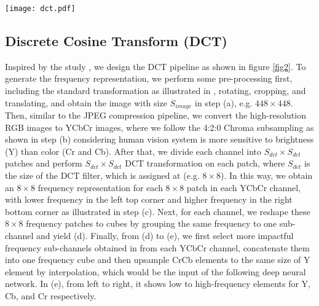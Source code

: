 \documentclass[10pt, conference, compsocconf]{IEEEtran}
\begin{document}
\begin{figure*}[tp]
\centering
\texttt{[image: dct.pdf]}\caption{{}{(a) images after preprocessing, e.g. $448\times448\times3$. (b) transform RGB to YCbCr images, Y: $448\times448$, Cr and Cb: $224\times224$. (c) frequency representation after DCT transformation with a filter, e.g. 8x8, (d) reorganize frequency representations by frequency channels, Y: $56\times56\times64$, Cb and Cr: $28\times28\times64$. (e) upsample all $Cr_{dct}$ and $Cb_{dct}$ frequency channels to the same size with $Y_{dct}$ channels and keep those frequency selected channels. Y: $56\times56\times16$, Cb and Cr: $28\times28\times4$.}}
\label{fig2}
\end{figure*}
\subsection{Discrete Cosine Transform (DCT)}

Inspired by the study \cite{XuKai2020}, we design the DCT pipeline as shown in figure \ref{fig2}. To generate the frequency representation, we perform some pre-processing first, including the standard transformation as illustrated in \cite{krizhevsky2017imagenet}, rotating, cropping, and translating, and obtain the image with size $S_{image}$ in step (a), e.g. $448\times 448$. Then, similar to the JPEG compression pipeline, we convert the high-resolution RGB images to YCbCr images, where we follow the 4:2:0 Chroma subsampling as shown in step (b) considering human vision system is more sensitive to brightness (Y) than color (Cr and Cb). After that, we divide each channel into $S_{dct}\times S_{dct}$ patches and perform $S_{dct}\times S_{dct}$ DCT transformation on each patch, where $S_{dct}$ is the size of the DCT filter, which is assigned at (e.g. $8\times 8$). In this way, we obtain an $8\times 8$ frequency representation for each $8\times 8$ patch in each YCbCr channel, with lower frequency in the left top corner and higher frequency in the right bottom corner as illustrated in step (c). Next, for each channel, we reshape these $8\times 8$ frequency patches to cubes by grouping the same frequency to one sub-channel and yield (d). Finally, from (d) to (e), we first select more impactful frequency sub-channels {}{obtained in} \cite{XuKai2020} from each YCbCr channel, concatenate them into one frequency cube and then upsample CrCb elements to the same size of Y element by interpolation, which would be the input of the following deep neural network. In (e), from left to right, it shows low to high-frequency elements for Y, Cb, and Cr respectively. 
\end{document}

